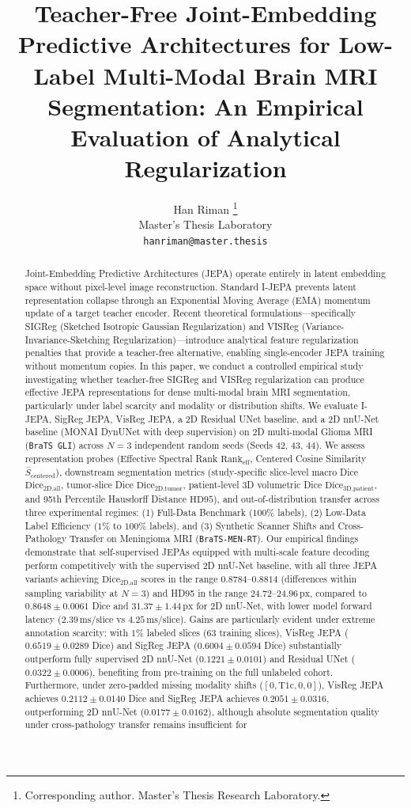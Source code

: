 \documentclass{article}
\title{Teacher-Free Joint-Embedding Predictive Architectures for Low-Label Multi-Modal Brain MRI Segmentation: An Empirical Evaluation of Analytical Regularization}
\author{%
  Han Riman \thanks{Corresponding author. Master's Thesis Research Laboratory.} \\
  Master's Thesis Laboratory \\
  \texttt{hanriman@master.thesis} \\
}
\begin{document}
\maketitle

\begin{abstract}
Joint-Embedding Predictive Architectures (JEPA) operate entirely in latent embedding space without pixel-level image reconstruction. Standard I-JEPA prevents latent representation collapse through an Exponential Moving Average (EMA) momentum update of a target teacher encoder. Recent theoretical formulations---specifically SIGReg (Sketched Isotropic Gaussian Regularization) and VISReg (Variance-Invariance-Sketching Regularization)---introduce analytical feature regularization penalties that provide a teacher-free alternative, enabling single-encoder JEPA training without momentum copies. In this paper, we conduct a controlled empirical study investigating whether teacher-free SIGReg and VISReg regularization can produce effective JEPA representations for dense multi-modal brain MRI segmentation, particularly under label scarcity and modality or distribution shifts. We evaluate I-JEPA, SigReg JEPA, VisReg JEPA, a 2D Residual UNet baseline, and a 2D nnU-Net baseline (MONAI DynUNet with deep supervision) on 2D multi-modal Glioma MRI (\texttt{BraTS GLI}) across $N=3$ independent random seeds (Seeds 42, 43, 44). We assess representation probes (Effective Spectral Rank $\text{Rank}_{\text{eff}}$, Centered Cosine Similarity $\bar{S}_{\text{centered}}$), downstream segmentation metrics (study-specific slice-level macro Dice $\text{Dice}_{\text{2D,all}}$, tumor-slice Dice $\text{Dice}_{\text{2D,tumor}}$, patient-level 3D volumetric Dice $\text{Dice}_{\text{3D,patient}}$, and 95th Percentile Hausdorff Distance $\text{HD95}$), and out-of-distribution transfer across three experimental regimes: (1) Full-Data Benchmark ($100\%$ labels), (2) Low-Data Label Efficiency ($1\%$ to $100\%$ labels), and (3) Synthetic Scanner Shifts and Cross-Pathology Transfer on Meningioma MRI (\texttt{BraTS-MEN-RT}). Our empirical findings demonstrate that self-supervised JEPAs equipped with multi-scale feature decoding perform competitively with the supervised 2D nnU-Net baseline, with all three JEPA variants achieving $\text{Dice}_{\text{2D,all}}$ scores in the range $0.8784$--$0.8814$ (differences within sampling variability at $N=3$) and HD95 in the range $24.72$--$24.96\,\text{px}$, compared to $0.8648 \pm 0.0061$ Dice and $31.37 \pm 1.44\,\text{px}$ for 2D nnU-Net, with lower model forward latency ($2.39\,\text{ms/slice}$ vs $4.25\,\text{ms/slice}$). Gains are particularly evident under extreme annotation scarcity: with $1\%$ labeled slices ($63$ training slices), VisReg JEPA ($0.6519 \pm 0.0289$ Dice) and SigReg JEPA ($0.6004 \pm 0.0594$ Dice) substantially outperform fully supervised 2D nnU-Net ($0.1221 \pm 0.0101$) and Residual UNet ($0.0322 \pm 0.0006$), benefiting from pre-training on the full unlabeled cohort. Furthermore, under zero-padded missing modality shifts ($[0, \text{T1c}, 0, 0]$), VisReg JEPA achieves $0.2112 \pm 0.0140$ Dice and SigReg JEPA achieves $0.2051 \pm 0.0316$, outperforming 2D nnU-Net ($0.0177 \pm 0.0162$), although absolute segmentation quality under cross-pathology transfer remains insufficient for 
\end{abstract}
\end{document}
